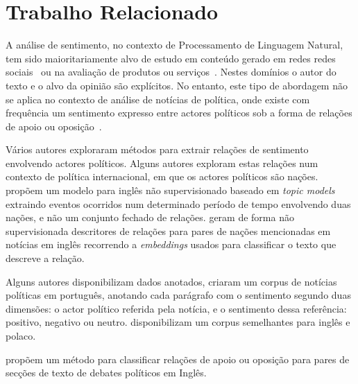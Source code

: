 \documentclass[a4paper, twocolumn, 11pt, twoside]{article}
\begin{document}
\section{Trabalho Relacionado}
\label{sec_related_work}
A análise de sentimento, no contexto de Processamento de Linguagem Natural, tem sido maioritariamente alvo de estudo em conteúdo gerado em redes redes sociais~\citep{10.1145/3185045} ou na avaliação de produtos ou serviços~\citep{pontiki-etal-2016-semeval}. Nestes domínios o autor do texto e o alvo da opinião são explícitos. No entanto, este tipo de abordagem não se aplica no contexto de análise de notícias de política, onde existe com frequência um sentimento expresso entre actores políticos sob a forma de relações de apoio ou oposição~\citep{balahur2009opinion, balahur-etal-2010-sentiment}.

Vários autores exploraram métodos para extrair relações de sentimento envolvendo actores políticos. Alguns autores exploram estas relações num contexto de política internacional, em que os actores políticos são  nações. \cite{oconnor-etal-2013-learning} propõem um modelo para inglês não supervisionado baseado em \textit{topic models} extraindo eventos ocorridos num determinado período de tempo envolvendo duas nações, e não um conjunto fechado de relações. \cite{han-etal-2019-permanent} geram de forma não supervisionada descritores de relações para pares de nações mencionadas em notícias em inglês recorrendo a \textit{embeddings} usados para classificar o texto que descreve a relação.

Alguns autores disponibilizam dados anotados, \cite{de-arruda-etal-2015-annotated} criaram um corpus de notícias políticas em português, anotando cada parágrafo com o sentimento segundo duas dimensões: o actor político referida pela notícia, e o sentimento dessa referência: positivo, negativo ou neutro. \cite{BARANIAK20213627} disponibilizam um corpus semelhantes para inglês e polaco.

\cite{cocarascu-toni-2017-identifying} propõem um método para classificar relações de apoio ou oposição para pares de secções de texto de debates políticos em Inglês.
\end{document}
